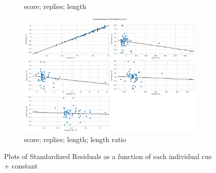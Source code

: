 \documentclass[11pt, oneside]{article}   	%
\begin{document}
\begin{figure}[H]
\begin{subfigure}{.5\textwidth}
  \caption{score; replies; length}
\end{subfigure}%
\begin{subfigure}{.5\textwidth}
  \centering
  \includegraphics[width=\linewidth]{../plots/fnn_data/hierarchy1/partial_regression_3}
  \caption{score; replies; length; length ratio}
\end{subfigure}
\caption{Plots of Standardized Residuals as a function of each individual cue + constant}
\end{figure}
\end{document}

